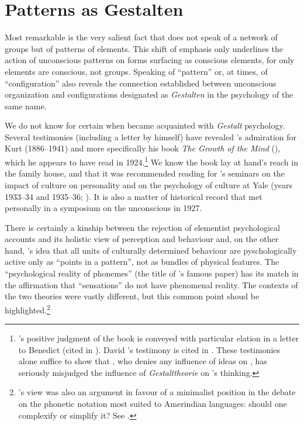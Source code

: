 \documentclass[output=paper]{langscibook}
\begin{document}
\section{Patterns as Gestalten}
\label{sec:fortis:patternsgestalten}

Most remarkable is the very salient fact that {\Sapir} does not speak of a network of groups but of patterns of elements. This shift of emphasis only underlines the action of unconscious patterns on forms surfacing as conscious elements, for only elements are conscious, not groups. Speaking of ``pattern'' or, at times, of ``configuration'' also reveals the connection {\Sapir} established between unconscious organization and configurations designated as \emph{Gestalten} in the psychology of the same name. 

We do not know for certain when {\Sapir} became acquainted with \emph{Gestalt} psychology. Several testimonies (including a letter by {\Sapir} himself) have revealed {\Sapir}'s admiration for Kurt {\Koffka} (1886--1941) and more specifically his book \emph{The Growth of the Mind} (\citeyear{Koffka1924}), which he appears to have read in 1924.\footnote{{\Sapir}'s positive judgment of the book is conveyed with particular elation in a letter to Benedict (cited in \citealt[121]{Sapir2002}). David {\Sapir}'s testimony is cited in \citet[478]{Cowan1986}. These testimonies alone suffice to show that \citet{Murray1981}, who denies any influence of  ideas on {\Sapir}, has seriously misjudged the influence of \emph{Gestalttheorie} on {\Sapir}'s thinking.} We know the book lay at hand's reach in the family house, and that it was recommended reading for {\Sapir}'s seminars on the impact of culture on personality and on the psychology of culture at Yale (years 1933--34 and 1935--36; \citealt[677]{Sapir19991933}). It is also a matter of historical record that {\Sapir} met {\Koffka} personally in a symposium on the unconscious in 1927. 

There is certainly a kinship between the  rejection of elementist psychological accounts and its holistic view of perception and behaviour and, on the other hand, {\Sapir}'s idea that all units of culturally determined behaviour are pyschologically active only as ``points in a pattern'', not as bundles of physical features. The ``psychological reality of phonemes'' (the title of {\Sapir}'s famous paper) has its match in the  affirmation that ``sensations'' do not have phenomenal reality. The contexts of the two theories were vastly different, but this common point shoud be highlighted.\footnote{{\Sapir}'s view was also an argument in favour of a minimalist position in the debate on the phonetic notation most suited to Amerindian languages: should one complexify or simplify it? See \citet[285]{Darnell1990}.}
\end{document}
